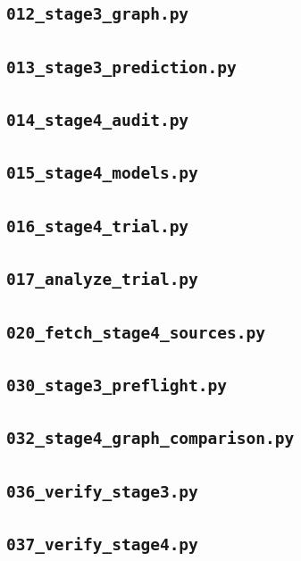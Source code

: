 \subsection*{\texttt{012\_stage3\_graph.py}}

\subsection*{\texttt{013\_stage3\_prediction.py}}

\subsection*{\texttt{014\_stage4\_audit.py}}

\subsection*{\texttt{015\_stage4\_models.py}}

\subsection*{\texttt{016\_stage4\_trial.py}}

\subsection*{\texttt{017\_analyze\_trial.py}}

\subsection*{\texttt{020\_fetch\_stage4\_sources.py}}

\subsection*{\texttt{030\_stage3\_preflight.py}}

\subsection*{\texttt{032\_stage4\_graph\_comparison.py}}

\subsection*{\texttt{036\_verify\_stage3.py}}

\subsection*{\texttt{037\_verify\_stage4.py}}

